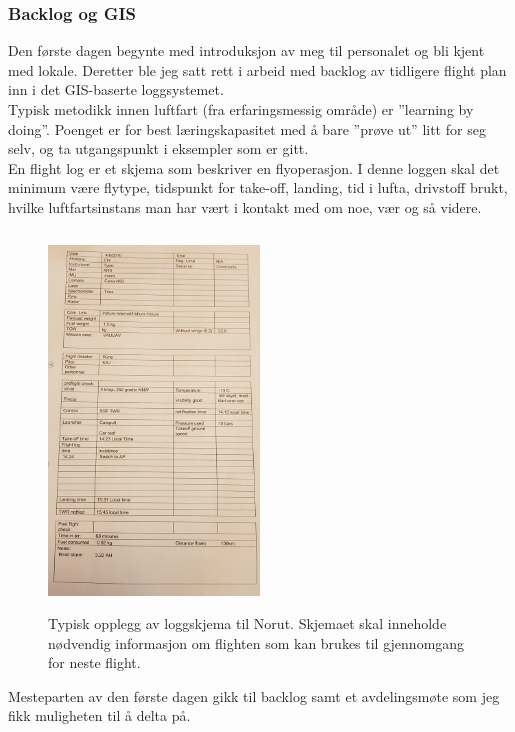 \documentclass[12pt, a4paper]{report}
\begin{document}
\subsubsection{Backlog og GIS}
Den første dagen begynte med introduksjon av meg til personalet og bli kjent med lokale. Deretter ble jeg satt rett i arbeid med backlog av tidligere flight plan inn i det GIS-baserte loggsystemet. \\
Typisk metodikk innen luftfart (fra erfaringsmessig område) er ''learning by doing''. Poenget er for best læringskapasitet med å bare ''prøve ut'' litt for seg selv, og ta utgangspunkt i eksempler som er gitt.\\
En flight log er et skjema som beskriver en flyoperasjon. I denne loggen skal det minimum være flytype, tidspunkt for take-off, landing, tid i lufta, drivstoff brukt, hvilke luftfartsinstans man har vært i kontakt med om noe, vær og så videre. %

\begin{figure}[ht]
	\centering
	\includegraphics[height= 10cm, width=0.5\textwidth]{bilder/flightlogNorut.png}
		\caption{Typisk opplegg av loggskjema til Norut. Skjemaet skal inneholde nødvendig informasjon om flighten som kan brukes til gjennomgang for neste flight. }
\end{figure}
\newpage
Mesteparten av den første dagen gikk til backlog samt et avdelingsmøte som jeg fikk muligheten til å delta på.\\
\end{document}
